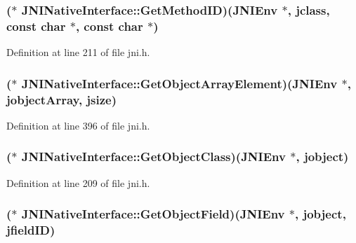 \hypertarget{struct_j_n_i_native_interface_a7524d0e525085f2eff964a6b927e9096}{
\subsubsection[{Get\-Method\-I\-D}]{($\ast$ J\-N\-I\-Native\-Interface\-::\-Get\-Method\-I\-D)({\bf J\-N\-I\-Env} $\ast$, {\bf jclass}, const char $\ast$, const char $\ast$)}}\label{struct_j_n_i_native_interface_a7524d0e525085f2eff964a6b927e9096}


Definition at line 211 of file jni.\-h.

\hypertarget{struct_j_n_i_native_interface_adeb611438ef77dd4f0f9d5048ca968ca}{
\subsubsection[{Get\-Object\-Array\-Element}]{($\ast$ J\-N\-I\-Native\-Interface\-::\-Get\-Object\-Array\-Element)({\bf J\-N\-I\-Env} $\ast$, {\bf jobject\-Array}, {\bf jsize})}}\label{struct_j_n_i_native_interface_adeb611438ef77dd4f0f9d5048ca968ca}


Definition at line 396 of file jni.\-h.

\hypertarget{struct_j_n_i_native_interface_a6bfdd41d727d2e890bbf7b9bfc7fed15}{
\subsubsection[{Get\-Object\-Class}]{($\ast$ J\-N\-I\-Native\-Interface\-::\-Get\-Object\-Class)({\bf J\-N\-I\-Env} $\ast$, {\bf jobject})}}\label{struct_j_n_i_native_interface_a6bfdd41d727d2e890bbf7b9bfc7fed15}


Definition at line 209 of file jni.\-h.

\hypertarget{struct_j_n_i_native_interface_a56ee87eee04c220f3debecf71d845cd6}{
\subsubsection[{Get\-Object\-Field}]{($\ast$ J\-N\-I\-Native\-Interface\-::\-Get\-Object\-Field)({\bf J\-N\-I\-Env} $\ast$, {\bf jobject}, {\bf jfield\-I\-D})}}\label{struct_j_n_i_native_interface_a56ee87eee04c220f3debecf71d845cd6}


